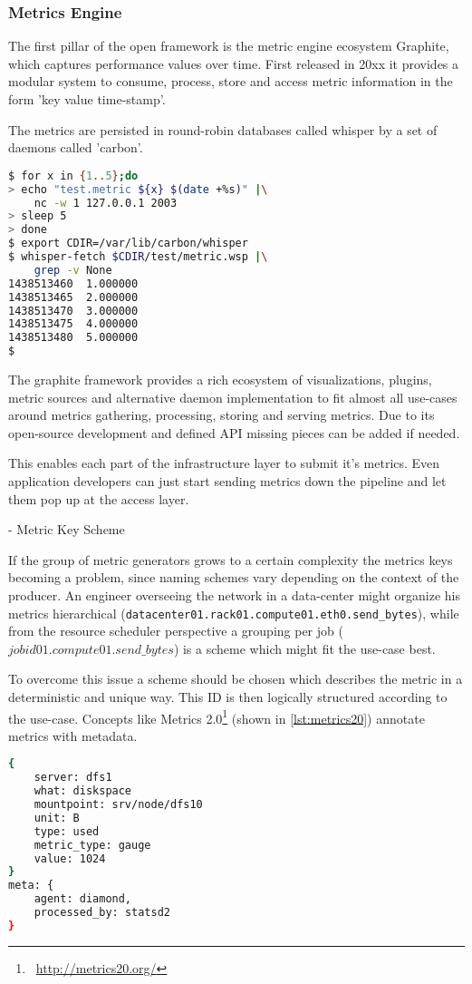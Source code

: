\subsubsection{Metrics Engine}
The first pillar of the open framework is the metric engine ecosystem Graphite, which captures performance values over time. 
First released in 20xx it provides a modular system to consume, process, store and access metric information in the form 'key value time-stamp'.

The metrics are persisted in round-robin databases called whisper by a set of daemons called 'carbon'.

\begin{lstlisting}[language=bash,
    caption={Sending and receiving metrics using carbon in combination with a whisper file back-end.},
    label={lst:carbon_wsp}]
$ for x in {1..5};do
> echo "test.metric ${x} $(date +%s)" |\
    nc -w 1 127.0.0.1 2003
> sleep 5
> done
$ export CDIR=/var/lib/carbon/whisper
$ whisper-fetch $CDIR/test/metric.wsp |\
    grep -v None
1438513460	1.000000
1438513465	2.000000
1438513470	3.000000
1438513475	4.000000
1438513480	5.000000
$
\end{lstlisting}

The graphite framework provides a rich ecosystem of visualizations, plugins, metric sources and alternative daemon implementation to fit almost
all use-cases around metrics gathering, processing, storing and serving metrics. Due to its open-source development and defined API missing pieces
can be added if needed.

This enables each part of the infrastructure layer to submit it's metrics. Even application developers can just start sending metrics down the pipeline and
let them pop up at the access layer.

- Metric Key Scheme

If the group of metric generators grows to a certain complexity the metrics keys becoming a problem, since naming schemes vary depending on the context of
the producer. An engineer overseeing the network in a data-center might organize his metrics hierarchical (\lstinline{datacenter01.rack01.compute01.eth0.send_bytes}), while from the
resource scheduler perspective a grouping per job ($jobid01.compute01.send\_bytes$) is a scheme which might fit the use-case best.

To overcome this issue a scheme should be chosen which describes the metric in a deterministic and unique way. This ID is then logically structured according to the use-case.
Concepts like Metrics 2.0\footnote{\Mundus~\url{http://metrics20.org/}} (shown in \autoref{lst:metrics20}) annotate metrics with metadata.

\begin{lstlisting}[language=bash,
    caption={Metrics2.0 formatted metric},
    label={lst:metrics20}]
{
    server: dfs1
    what: diskspace
    mountpoint: srv/node/dfs10
    unit: B
    type: used
    metric_type: gauge
    value: 1024
}
meta: {
    agent: diamond,
    processed_by: statsd2
}
\end{lstlisting}
